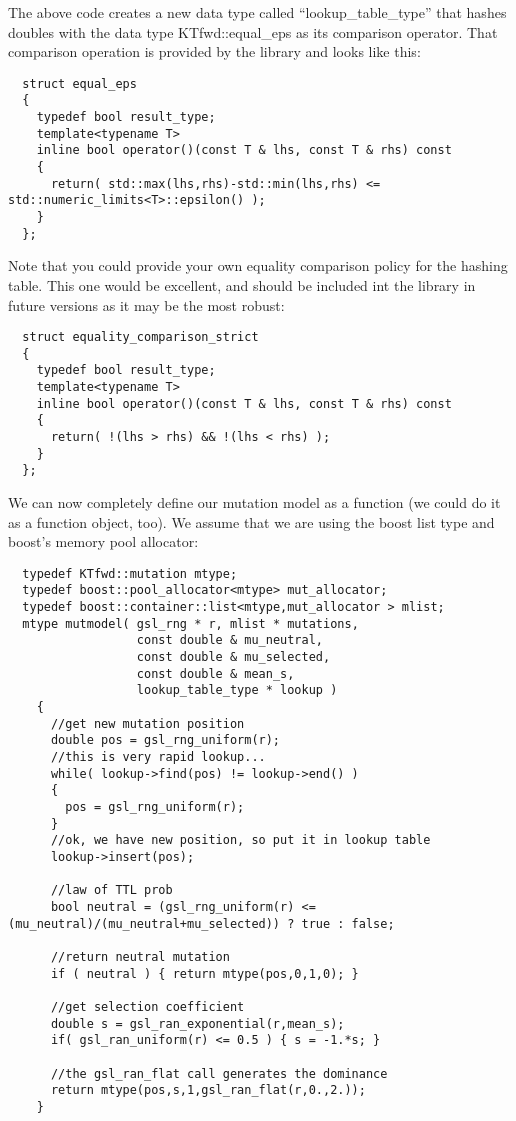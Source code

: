 \documentclass{article}
\begin{document}
The above code creates a new data type called ``lookup\_table\_type'' that hashes doubles with the data type KTfwd::equal\_eps as its comparison operator.  That comparison operation is provided by the library and looks like this:
\begin{lstlisting}
  struct equal_eps
  {
    typedef bool result_type;
    template<typename T>
    inline bool operator()(const T & lhs, const T & rhs) const
    {
      return( std::max(lhs,rhs)-std::min(lhs,rhs) <= std::numeric_limits<T>::epsilon() );
    }
  };
\end{lstlisting}

Note that you could provide your own equality comparison policy for the hashing table.  This one would be excellent, and should be included int the library in future versions as it may be the most robust:
\begin{lstlisting}
  struct equality_comparison_strict
  {
    typedef bool result_type;
    template<typename T>
    inline bool operator()(const T & lhs, const T & rhs) const
    {
      return( !(lhs > rhs) && !(lhs < rhs) );
    }
  };
\end{lstlisting}

We can now completely define our mutation model as a function (we could do it as a function object, too).  We assume that we are using the boost list type and boost's memory pool allocator:

\begin{lstlisting}
  typedef KTfwd::mutation mtype;
  typedef boost::pool_allocator<mtype> mut_allocator;
  typedef boost::container::list<mtype,mut_allocator > mlist;
  mtype mutmodel( gsl_rng * r, mlist * mutations,
                  const double & mu_neutral,
                  const double & mu_selected,
                  const double & mean_s,
                  lookup_table_type * lookup )
    {
      //get new mutation position
      double pos = gsl_rng_uniform(r);
      //this is very rapid lookup...
      while( lookup->find(pos) != lookup->end() )
      {
        pos = gsl_rng_uniform(r);
      }
      //ok, we have new position, so put it in lookup table
      lookup->insert(pos);

      //law of TTL prob
      bool neutral = (gsl_rng_uniform(r) <= (mu_neutral)/(mu_neutral+mu_selected)) ? true : false;

      //return neutral mutation
      if ( neutral ) { return mtype(pos,0,1,0); }

      //get selection coefficient
      double s = gsl_ran_exponential(r,mean_s);
      if( gsl_ran_uniform(r) <= 0.5 ) { s = -1.*s; }

      //the gsl_ran_flat call generates the dominance
      return mtype(pos,s,1,gsl_ran_flat(r,0.,2.));
    }
\end{lstlisting}
\end{document}
